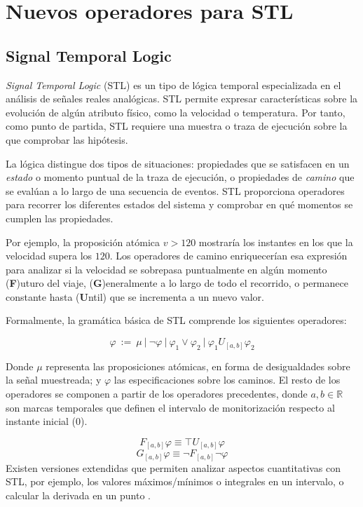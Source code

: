 \chapter{Nuevos operadores para STL}
\label{cha:stl}

\section{Signal Temporal Logic}
\textit{Signal Temporal Logic} (STL) \cite{STL} es un tipo de lógica temporal especializada en el análisis de señales reales analógicas. STL permite expresar características sobre la evolución de algún atributo físico, como la velocidad o temperatura. Por tanto, como punto de partida, STL requiere una muestra o traza de ejecución sobre la que comprobar las hipótesis.

La lógica distingue dos tipos de situaciones: propiedades que se satisfacen en un \textit{estado} o momento puntual de la traza de ejecución, o propiedades de \textit{camino} que se evalúan a lo largo de una secuencia de eventos. STL proporciona operadores para recorrer los diferentes estados del sistema y comprobar en qué momentos se cumplen las propiedades.

Por ejemplo, la proposición atómica $v > 120$ mostraría los instantes en los que la velocidad supera los $120$. Los operadores de camino enriquecerían esa expresión para analizar si la velocidad se sobrepasa puntualmente en algún momento (\textbf{F})uturo del viaje, (\textbf{G})eneralmente a lo largo de todo el recorrido, o permanece constante hasta (\textbf{U}ntil) que se incrementa a un nuevo valor. 

Formalmente, la gramática básica de STL comprende los siguientes operadores:

$$ \varphi \ := \ \mu \ |\ \neg \varphi \ |\ \varphi_{1} \lor \varphi_{2} \ |\ \varphi_{1} U_{[a,b]} \varphi_{2}$$

Donde $\mu$ representa las proposiciones atómicas, en forma de desigualdades sobre la señal muestreada; y $\varphi$ las especificaciones sobre los caminos. El resto de los operadores se componen a partir de los operadores precedentes, donde $a, b \in \mathbb{R}$ son marcas temporales que definen el intervalo de monitorización respecto al instante inicial (0). 


$$ F_{[a,b]} \varphi \equiv \top U_{[a,b]} \varphi $$
$$ G_{[a,b]} \varphi \equiv \neg F_{[a,b]} \neg \varphi $$
Existen versiones extendidas que permiten analizar aspectos cuantitativas con STL, por ejemplo, los valores máximos/mínimos \cite{TACAS_19} o integrales en un intervalo, o calcular la derivada en un punto \cite{Stl_Der_Int}.


